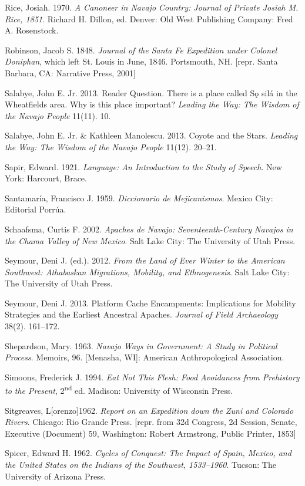 \begin{hang}
	Rice, Josiah. 1970. \textit{A Canoneer in Navajo Country: Journal of Private Josiah M. Rice, 1851}.  Richard H. Dillon, ed.  Denver:  Old West Publishing Company: Fred A. Rosenstock.

	Robinson, Jacob S. 1848.  \textit{ Journal of the Santa Fe Expedition under Colonel Doniphan}, which left St. Louis in June, 1846.   Portsmouth, NH.  [repr. Santa Barbara, CA:  Narrative Press, 2001]

	Salabye, John E. Jr.  2013.  Reader Question.  There is a place called Sǫ silá in the Wheatfields area. Why is this place important?  \textit{Leading the Way: The Wisdom of the Navajo People} 11(11). 10.

	Salabye, John E. Jr.  \& Kathleen Manolescu. 2013.  Coyote and the Stars.  \textit{Leading the Way: The Wisdom of the Navajo People} 11(12). 20--21.

	Sapir, Edward. 1921. \textit{Language: An Introduction to the Study of Speech}.  New York:  Harcourt, Brace.

	Santamaría, Francisco J.  1959.  \textit{Diccionario de Mejicanismos}.  Mexico City:  Editorial Porrúa.

	Schaafsma, Curtis F.  2002.  \textit{Apaches de Navajo: Seventeenth-Century Navajos in the Chama Valley of New Mexico}.  Salt Lake City: The University of Utah Press.

	Seymour, Deni J. (ed.).  2012.  \textit{From the Land of Ever Winter to the American Southwest: Athabaskan Migrations, Mobility, and Ethnogenesis}.  Salt Lake City:  The University of Utah Press.

	Seymour, Deni J. 2013.  Platform Cache Encampments: Implications for Mobility Strategies and the Earliest Ancestral Apaches.  \textit{Journal of Field Archaeology} 38(2). 161--172.

	Shepardson, Mary. 1963.  \textit{Navajo Ways in Government: A Study in Political Process}.  Memoirs, 96.  [Menasha, WI]:  American Anthropological Association.

	Simoons, Frederick J. 1994.  \textit{Eat Not This Flesh: Food Avoidances from Prehistory to the Present}, 2\textsuperscript{nd} ed.  Madison:  University of Wisconsin Press.

	Sitgreaves, L[orenzo]1962.  \textit{Report on an Expedition down the Zuni and Colorado Rivers}.  Chicago:  Rio Grande Press.  [repr. from 32d Congress, 2d Session, Senate, Executive (Document) 59, Washington:  Robert Armstrong, Public Printer, 1853]

	Spicer, Edward H.  1962.  \textit{Cycles of Conquest:  The Impact of Spain, Mexico, and the United States on the Indians of the Southwest, 1533--1960}.  Tucson:  The University of Arizona Press.


\end{hang}
